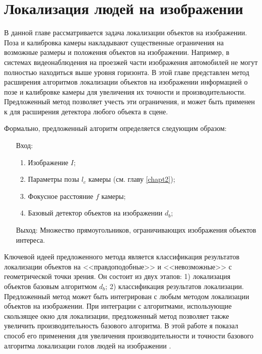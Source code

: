 
\chapter{Локализация людей на изображении} \label{chapt3}

В данной главе рассматривается задача локализации объектов на изображении. Поза и калибровка камеры накладывают существенные ограничения на возможные размеры и положения объектов на изображении. Например, в системах видеонаблюдения на проезжей части изображения автомобилей не могут полностью находиться выше уровня горизонта. В этой главе представлен метод расширения алгоритмов локализации объектов на изображении информацией о позе и калибровке камеры для увеличения их точности и производительности. Предложенный метод позволяет учесть эти ограничения, и может быть применен к для расширения детектора любого объекта в сцене.

Формально, предложенный алгоритм определяется следующим образом:
\begin{itemize}
	\item[Вход:]
	\begin{enumerate}
		\item Изображение $I$;
		\item Параметры позы $l_c$ камеры (см. главу \ref{chapt2});
		\item Фокусное расстояние $f$ камеры;
		\item Базовый детектор объектов на изображении $d_b$;
	\end{enumerate}
	\item[Выход:] Множество прямоугольников, ограничивающих изображения объектов интереса.
\end{itemize}

Ключевой идеей предложенного метода является классификация результатов локализации объектов на <<правдоподобные>> и <<невозможные>> с геометрической точки зрения. Он состоит из двух этапов: 1) локализация объектов базовым алгоритмом $d_b$; 2) классификация результатов локализации. Предложенный метод может быть интегрирован с любым методом локализации объектов на изображении. При интеграции с алгоритмами, использующие скользящее окно для локализации, предложенный метод позволяет также увеличить производительность базового алгоритма. В этой работе я показал способ его применения для увеличения производительности и точности базового алгоритма локализации голов людей на изображении \cite{prisacariu_reid_tr2310_09}.

